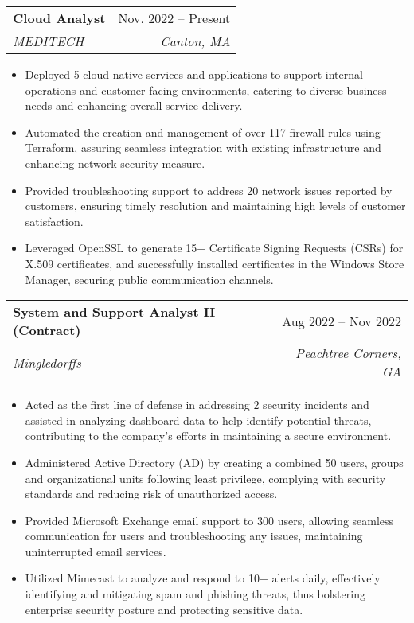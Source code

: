 \documentclass[letterpaper,10pt]{article}
\makeatletter
\newcommand{\resumeItem}[1]{
  \item\small{
    {#1 \vspace{-2pt}}
  }
}
\newcommand{\resumeSubheading}[4]{
  \vspace{-2pt}\item
    \begin{tabular*}{0.97\textwidth}[t]{l@{\extracolsep{\fill}}r}
      \textbf{#1} & #2 \\
      \textit{\small#3} & \textit{\small #4} \\
    \end{tabular*}\vspace{-7pt}
}
\newcommand{\resumeItemListStart}{\begin{itemize}}
\newcommand{\resumeItemListEnd}{\end{itemize}\vspace{-5pt}}
\makeatother
\begin{document}
    \resumeSubheading
      {Cloud Analyst}{Nov. 2022 -- Present}
      {MEDITECH}{Canton, MA}
      \resumeItemListStart
        \resumeItem{Deployed 5 cloud-native services and applications to support internal operations and customer-facing environments, catering to diverse business needs and enhancing overall service delivery.}
        \resumeItem{Automated the creation and management of over 117 firewall rules using Terraform, assuring seamless integration with existing infrastructure and enhancing network security measure.}
        \resumeItem{Provided troubleshooting support to address 20 network issues reported by customers, ensuring timely resolution and maintaining high levels of customer satisfaction.}
        \resumeItem{Leveraged OpenSSL to generate 15+ Certificate Signing Requests (CSRs) for X.509 certificates, and successfully installed certificates in the Windows Store Manager, securing public communication channels.}
    \resumeItemListEnd

    \resumeSubheading
      {System and Support Analyst II (Contract)}{Aug 2022 -- Nov 2022}
      {Mingledorffs}{Peachtree Corners, GA}
      \resumeItemListStart
        \resumeItem{Acted as the first line of defense in addressing 2 security incidents and assisted in analyzing dashboard data to help identify potential threats, contributing to the company's efforts in maintaining a secure environment.}
        \resumeItem{Administered Active Directory (AD) by creating a combined 50 users, groups and organizational units following least privilege, complying with security standards and reducing risk of unauthorized access.}
        \resumeItem{Provided Microsoft Exchange email support to 300 users, allowing seamless communication for users and troubleshooting any issues, maintaining uninterrupted email services.}
        \resumeItem{Utilized Mimecast to analyze and respond to 10+ alerts daily, effectively identifying and mitigating spam and phishing threats, thus bolstering enterprise security posture and protecting sensitive data.}
    \resumeItemListEnd
\end{document}
